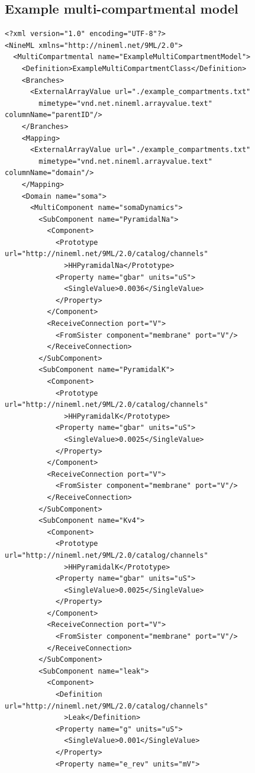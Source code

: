 \documentclass[draftspec]{ninemlspec}
\begin{document}
\clearpage
\subsection{Example multi-compartmental model}

\begin{lstlisting}
<?xml version="1.0" encoding="UTF-8"?>
<NineML xmlns="http://nineml.net/9ML/2.0">
  <MultiCompartmental name="ExampleMultiCompartmentModel">
    <Definition>ExampleMultiCompartmentClass</Definition>
    <Branches>
      <ExternalArrayValue url="./example_compartments.txt"
        mimetype="vnd.net.nineml.arrayvalue.text" columnName="parentID"/>
    </Branches>
    <Mapping>
      <ExternalArrayValue url="./example_compartments.txt"
        mimetype="vnd.net.nineml.arrayvalue.text" columnName="domain"/>
    </Mapping>
    <Domain name="soma">
      <MultiComponent name="somaDynamics">
        <SubComponent name="PyramidalNa">
          <Component>
            <Prototype url="http://nineml.net/9ML/2.0/catalog/channels"
              >HHPyramidalNa</Prototype>
            <Property name="gbar" units="uS">
              <SingleValue>0.0036</SingleValue>
            </Property>
          </Component>
          <ReceiveConnection port="V">
            <FromSister component="membrane" port="V"/>
          </ReceiveConnection>
        </SubComponent>
        <SubComponent name="PyramidalK">
          <Component>
            <Prototype url="http://nineml.net/9ML/2.0/catalog/channels"
              >HHPyramidalK</Prototype>
            <Property name="gbar" units="uS">
              <SingleValue>0.0025</SingleValue>
            </Property>
          </Component>
          <ReceiveConnection port="V">
            <FromSister component="membrane" port="V"/>
          </ReceiveConnection>
        </SubComponent>
        <SubComponent name="Kv4">
          <Component>
            <Prototype url="http://nineml.net/9ML/2.0/catalog/channels"
              >HHPyramidalK</Prototype>
            <Property name="gbar" units="uS">
              <SingleValue>0.0025</SingleValue>
            </Property>
          </Component>
          <ReceiveConnection port="V">
            <FromSister component="membrane" port="V"/>
          </ReceiveConnection>
        </SubComponent>
        <SubComponent name="leak">
          <Component>
            <Definition url="http://nineml.net/9ML/2.0/catalog/channels"
              >Leak</Definition>
            <Property name="g" units="uS">
              <SingleValue>0.001</SingleValue>
            </Property>
            <Property name="e_rev" units="mV">

\end{lstlisting}
\end{document}
